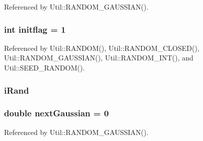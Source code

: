 Referenced by Util::RANDOM\_\-GAUSSIAN().
\subsubsection[initflag]{\setlength{\rightskip}{0pt plus 5cm}int {\bf initflag} = 1\hspace{0.3cm}{\tt  [static]}}\label{rand_8cpp_37b318383ca653e8042174ab53cfb827}




Referenced by Util::RANDOM(), Util::RANDOM\_\-CLOSED(), Util::RANDOM\_\-GAUSSIAN(), Util::RANDOM\_\-INT(), and Util::SEED\_\-RANDOM().
\subsubsection[iRand]{ {\bf iRand}\hspace{0.3cm}{\tt  [static]}}\label{rand_8cpp_d4151f36df5c34dea9fed4dce109d195}


\subsubsection[nextGaussian]{\setlength{\rightskip}{0pt plus 5cm}double {\bf nextGaussian} = 0\hspace{0.3cm}{\tt  [static]}}\label{rand_8cpp_0a52667c2e0e040b5dc629bf5ec51c35}




Referenced by Util::RANDOM\_\-GAUSSIAN().